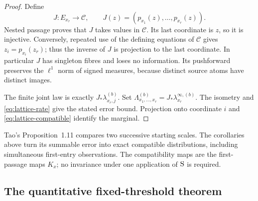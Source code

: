 \begin{proof}
Define
\[
 J:E_{x_r}\longrightarrow\mathcal C,\qquad
 J(z)=(p_{x_1}(z),\ldots,p_{x_r}(z)).
\]
Nested passage proves that $J$ takes values in $\mathcal C$. Its last
coordinate is $z$, so it is injective. Conversely, repeated use of the
defining equations of $\mathcal C$ gives $z_i=p_{x_i}(z_r)$; thus the
inverse of $J$ is projection to the last coordinate. In particular $J$
has singleton fibres and loses no information. Its pushforward preserves
the $\ell^1$ norm of signed measures, because distinct source atoms have
distinct images.

The finite joint law is exactly $J_*\lambda_{x_r,j}^{(b)}$.
Set $\Lambda_{x_1,\ldots,x_r}^{(b)}=J_*\lambda_{x_r}^{\infty,(b)}$.
The isometry and \eqref{eq:lattice-rate} give the stated error bound.
Projection onto coordinate $i$ and
\eqref{eq:lattice-compatible} identify the marginal.
\end{proof}

Tao's Proposition~1.11 compares two successive starting scales. The
corollaries above turn its summable error into exact compatible
distributions, including simultaneous first-entry observations. The
compatibility maps are the first-passage maps $K_x$; no invariance under
one application of $\mathrm S$ is required.

\subsection{The quantitative fixed-threshold theorem}

